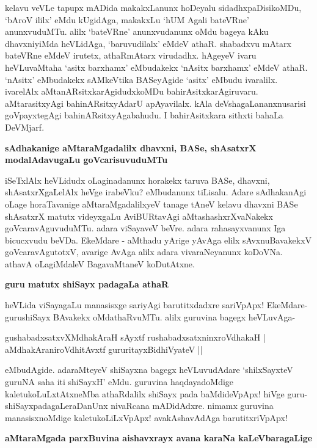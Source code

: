 kelavu veVLe tapupx mADida makakxLanunx hoDeyalu sidadhxpaDisikoMDu, `bAroV ililx' eMdu kUgidAga, makakxLu `hUM Agali bateVRne' anunxvuduMTu. alilx `bateVRne' anunxvudanunx oMdu bageya kAku dhavxniyiMda heVLidAga, `baruvudilalx' eMdeV athaR. shabadxvu mAtarx bateVRne eMdeV irutetx, athaRmAtarx virudadhx. hAgeyeV ivaru heVLuvaMtaha `asitx barxhamx' eMbudakekx `nAsitx barxhamx' eMdeV athaR. `nAsitx' eMbudakekx sAMkeVtika BASeyAgide `asitx' eMbudu ivaralilx. ivarelAlx aMtanARsitxkarAgidudxkoMDu bahirAsitxkarAgiruvaru. aMtarasitxyAgi bahinARsitxyAdarU apAyavilalx. kAla deVshagaLananxnusarisi goVpayxtegAgi bahinARsitxyAgabahudu. I bahirAsitxkara sithxti bahaLa DeVMjarf.

{\bigskip
\noindent
{\large\bf sAdhakanige aMtaraMgadalilx dhavxni, BASe, shAsatxrX modalAdavugaLu goVcarisuvuduMTu}}\label{page189a}
\medskip

\noindent
iSeTxlAlx heVLidudx oLaginadanunx horakekx taruva BASe, dhavxni, shAsatxrXgaLelAlx heVge irabeVku? eMbudanunx tiLisalu. Adare sAdhakanAgi oLage horaTavanige aMtaraMgadalilxyeV tanage tAneV kelavu dhavxni BASe shAsatxrX matutx videyxgaLu AviBURtavAgi aMtashashxrXvaNakekx goVcaravAguvuduMTu. adara viSayaveV beVre. adara rahasayxvanunx Iga bicucxvudu beVDa. EkeMdare - aMthadu yArige yAvAga elilx sAvxnuBavakekxV goVcaravAgutotxV, avarige AvAga alilx adara vivaraNeyanunx koDoVNa. athavA oLagiMdaleV BagavaMtaneV koDutAtxne.

{\bigskip
\noindent
{\large\bf guru matutx shiSayx padagaLa athaR}}\label{page190}
\medskip

\noindent
heVLida viSayagaLu manasisxge sariyAgi barutitxdadxre sariVpApx! EkeMdare- gurushiSayx BAvakekx oMdathaRvuMTu. alilx guruvina bagegx heVLuvAga-

\begin{shloka}
gushabadxsatxvXMdhakAraH sAyxtf rushabadxsatxninxroVdhakaH |\\\label{190}
aMdhakAraniroVdhitAvxtf gururitayxBidhiVyateV ||
\end{shloka}

\noindent
eMbudAgide. adaraMteyeV shiSayxna bagegx heVLuvudAdare `shilxSayxteV guruNA saha iti shiSayxH'\label{190a} eMdu. guruvina haqdayadoMdige kaletukoLuLxtAtxneMba athaRdalilx shiSayx pada baMdideVpApx! hiVge guru- shiSayxpadagaLeraDanUnx nivaRcana mADidAdxre. nimamx guruvina manasisxnoMdige kaletukoLiLxVpApx! avakAshavAdAga barutitxriVpApx!

{\bigskip
\noindent
{\large\bf aMtaraMgada parxBuvina aishavxrayx avana karaNa kaLeVbaragaLige}}\label{page190a}
\medskip

